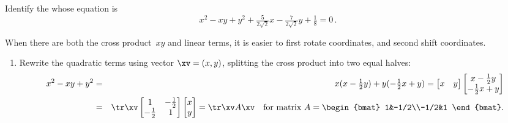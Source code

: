 \begin{example} \label{eg:cstrrc2}
Identify the  whose equation is
\begin{equation*}
x^2-xy+y^2+\tfrac5{2\sqrt2}x-\tfrac7{2\sqrt2}y+\tfrac18=0\,.
\end{equation*}
\begin{solution} 
When there are both the cross product~\(xy\) and linear terms, it is  easier to first rotate coordinates, and second shift coordinates. 
\begin{enumerate}
\item Rewrite the quadratic terms using vector \(\xv=(x,y)\), splitting the cross product into two equal halves:
\begin{eqnarray*}
x^2-xy+y^2
&=&x(x-\tfrac12y)+y(-\tfrac12x+y)
=\begin{bmatrix} x&y \end{bmatrix}
\begin{bmatrix} x-\tfrac12y\\-\tfrac12x+y \end{bmatrix}
\\&=&\tr\xv 
\begin{bmatrix} 1&-\tfrac12\\-\tfrac12&1 \end{bmatrix}
\begin{bmatrix} x\\y \end{bmatrix}
=\tr\xv A\xv
\quad\text{for matrix }A=
\begin{bmat} 1&-1/2\\-1/2&1 \end{bmat}.
\end{eqnarray*}



\end{enumerate}
\end{solution}
\end{example}

